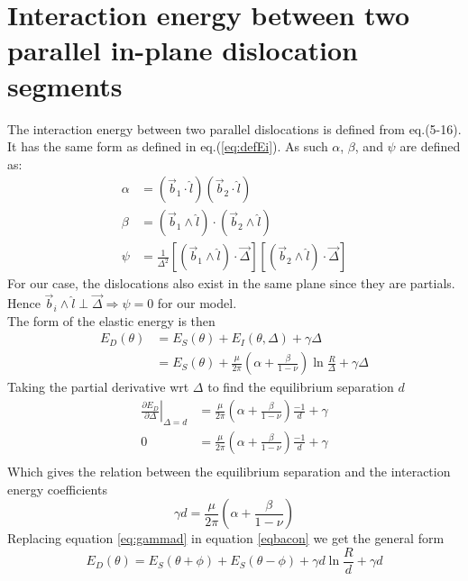 \documentclass[10pt,a4paper,final]{article}
\begin{document}
\section{Interaction energy between two parallel in-plane dislocation segments}
The interaction energy between two parallel dislocations is defined from eq.(5-16)\cite{hirth1982theory}. It has the same form as defined in eq.(\ref{eq:defEi}). As such $\alpha$, $\beta$, and $\psi$ are defined as:
\begin{subequations}
\begin{align}
\alpha &= \left(\vec{b}_1 \cdot \hat{l}\right)\left(\vec{b}_2 \cdot \hat{l}\right) \\
\beta &= \left(\vec{b}_1 \wedge \hat{l}\right) \cdot \left(\vec{b}_2 \wedge \hat{l}\right) \\
\psi &= \frac{1}{\Delta^2}\left[\left(\vec{b}_1 \wedge \hat{l}\right) \cdot \vec{\Delta}\right]
\left[\left(\vec{b}_2 \wedge \hat{l}\right) \cdot \vec{\Delta}\right]
\end{align}
\label{eq:alphabeta}
\end{subequations}
For our case, the dislocations also exist in the same plane since they are partials. Hence $\vec{b}_i \wedge \hat{l} \perp \vec{\Delta} \Rightarrow \psi = 0$ for our model. \\ 

The form of the elastic energy is then
\begin{subequations}
\begin{align*}
E_D(\theta) &= E_S(\theta) + E_I(\theta,\Delta) + \gamma\Delta \\
 &= E_S(\theta) + \frac{\mu}{2\pi}\left(\alpha+\frac{\beta}{1-\nu}\right)\ln\frac{R}{\Delta} + \gamma\Delta
\end{align*}
\end{subequations}
Taking the partial derivative wrt $\Delta$ to find the equilibrium separation $d$
\begin{subequations}
\begin{align*}
\left.\frac{\partial E_D}{\partial\Delta}\right|_{\Delta=d} &= \frac{\mu}{2\pi}\left(\alpha+\frac{\beta}{1-\nu}\right)\frac{-1}{d} + \gamma \\
0 &= \frac{\mu}{2\pi}\left(\alpha+\frac{\beta}{1-\nu}\right)\frac{-1}{d} + \gamma \\
\end{align*}
\end{subequations} 
Which gives the relation between the equilibrium separation and the interaction energy coefficients
\begin{equation}
\gamma d = \frac{\mu}{2\pi}\left(\alpha+\frac{\beta}{1-\nu}\right) \label{eq:gammad}
\end{equation}
Replacing equation \ref{eq:gammad} in equation \ref{eqbacon} we get the general form
\begin{equation}
\boxed{
E_D(\theta) = E_S(\theta+\phi) + E_S(\theta-\phi) + \gamma d \ln\frac{R}{d} + \gamma d} \label{eq:finalED}
\end{equation}
\end{document}
